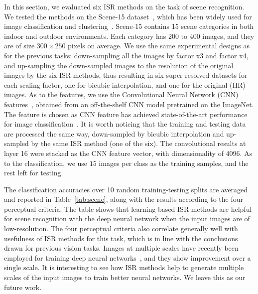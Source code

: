 \documentclass[10pt,twocolumn,letterpaper]{article}
\begin{document}
In this section, we evaluated six ISR methods on the task of scene recognition. 
We tested the methods on the Scene-15 dataset~\cite{lazebnik:cvpr06}, which has been widely 
used for image classification and clustering~\cite{lazebnik:cvpr06, dai:ensemble:eccv12, dai:EnPro:iccv13}. 
Scene-15 contains 15
scene categories in both indoor and outdoor environments. Each category has 200
to 400 images, and they are of size $300 \times 250$ pixels on average.
We use the same experimental designs as for the previous tasks:  down-sampling all the images by 
factor x3 and factor x4, and up-sampling the down-sampled images to the
resolution of the original images by the six ISR methods, thus resulting in six super-resolved datasets 
for each scaling factor, one for bicubic interpolation, and one for the original (HR) images.  
As to the features, we use the  Convolutional Neural Network (CNN) features~\cite{deep:bmvc14}, 
obtained from an off-the-shelf CNN model pretrained on the ImageNet. The feature is  chosen as CNN 
feature has achieved state-of-the-art performance for image
classification~\cite{deep:bmvc14}. It is worth noticing that the training and testing data are processed 
the same way, \ie down-sampled by bicubic interpolation and up-sampled by the same ISR method (one of the six).  
The convolutional results at layer 16 were
stacked as the CNN feature vector, with dimensionality of
4096.  As to the classification, we use $15$ images per class as the training samples, and the rest left for testing. 

The classification accuracies over 10 random training-testing splits are averaged and reported in Table~\ref{tab:scene}, along with the results according to the four perceptual criteria.  
The table shows that learning-based ISR methods are helpful for scene 
recognition with the deep neural network when the input images are of low-resolution. 
The four perceptual criteria also correlate 
generally well with usefulness of ISR methods for this task, 
which is in line with the conclusions drawn for previous vision tasks.   
Images at multiple scales have recently been employed for training deep 
neural networks~\cite{cnn:multi-scale, fully_cnn},  and 
they show improvement over a single scale.  It is interesting to 
see how ISR methods help to generate multiple scales of the input images to train 
better neural networks. We leave this as our future work. 



\end{document}
